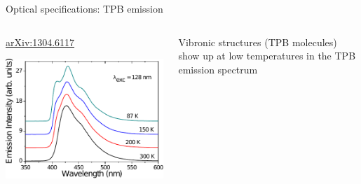 \documentclass[10pt,aspectratio=169]{beamer}
\newcommand{\arxiv}[1]{\href{https://arxiv.org/abs/#1}{\smaller\ttfamily arXiv:#1}}
\begin{document}
\begin{frame}{Optical specifications: TPB emission}
  \begin{columns}
    \begin{column}{0.5\textwidth}
      \begin{center}
        \arxiv{1304.6117}
      \end{center}
      \includegraphics[width=\columnwidth]{tpb-emission-paper.pdf}
    \end{column}
    \begin{column}{0.5\textwidth}\setlength{\parskip}{10pt}%
      Vibronic structures (TPB molecules) show up at low temperatures in the
      TPB emission spectrum
    \end{column}
  \end{columns}
\end{frame}
\end{document}
